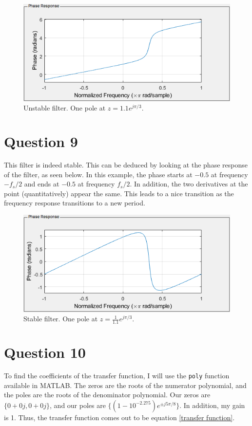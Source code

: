 \documentclass{article}
\renewcommand{\c}[1]{\texttt{#1}}
\begin{document}
\begin{figure}[H]
    \centering
    \includegraphics[width=\textwidth]{Images/unstable}
    \caption{Unstable filter. One pole at \(z = 1.1e^{j\pi/3}\).}
    \label{plot:unstable phase}
\end{figure}

\section*{Question 9}
This filter is indeed stable. This can be deduced by looking at
the phase response of the filter, as seen below. In this
example, the phase starts at \(-0.5\) at frequency \(-f_s/2\)
and ends at \(-0.5\) at frequency \(f_s/2\). In addition,
the two derivatives at the point (quantitatively) appear the
same. This leads to a nice transition as the frequency
response transitions to a new period.

\begin{figure}[H]
    \centering
    \includegraphics[width=\textwidth]{Images/stable}
    \caption{Stable filter. One pole at \(z=\frac{1}{1.1}e^{j\pi/3}\).}
    \label{plot:stable phase}
\end{figure}

\section*{Question 10}
To find the coefficients of the transfer function, I will use
the \c{poly} function available in MATLAB. The zeros are the
roots of the numerator polynomial, and the poles are the roots
of the denominator polynomial. Our zeros are
\(\{0 + 0j, 0 + 0j\}\), and our poles are
\(\{\left(1-10^{-2.275}\right) e^{\pm j5\pi /8}\}\).
In addition, my gain is 1.
Thus, the transfer function comes out to be equation
\eqref{transfer function}.
\end{document}
